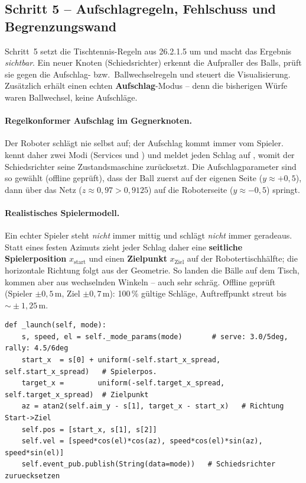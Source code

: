 \subsection{Schritt 5 -- Aufschlagregeln, Fehlschuss und Begrenzungswand}
Schritt~5 setzt die Tischtennis-Regeln aus 26.2.1.5 um und macht das Ergebnis
\emph{sichtbar}. Ein neuer Knoten  (Schiedsrichter) erkennt
die Aufpraller des Balls, prüft sie gegen die Aufschlag- bzw.\ Ballwechselregeln
und steuert die Visualisierung. Zusätzlich erhält  einen
echten \textbf{Aufschlag}-Modus -- denn die bisherigen Würfe waren Ballwechsel,
keine Aufschläge.

\paragraph{Regelkonformer Aufschlag im Gegnerknoten.} Der Roboter schlägt nie
selbst auf; der Aufschlag kommt immer vom Spieler.  kennt
daher zwei Modi (Services  und ) und
meldet jeden Schlag auf , womit der Schiedsrichter seine
Zustandsmaschine zurücksetzt. Die Aufschlagparameter sind so gewählt (offline
geprüft), dass der Ball zuerst auf der eigenen Seite ($y\approx+0{,}5$), dann über
das Netz ($z\approx0{,}97>0{,}9125$) auf die Roboterseite ($y\approx-0{,}5$) springt.

\paragraph{Realistisches Spielermodell.} Ein echter Spieler steht \emph{nicht}
immer mittig und schlägt \emph{nicht} immer geradeaus. Statt eines festen Azimuts
zieht jeder Schlag daher eine \textbf{seitliche Spielerposition} $x_{\text{start}}$
und einen \textbf{Zielpunkt} $x_{\text{Ziel}}$ auf der Robotertischhälfte; die
horizontale Richtung folgt aus der Geometrie. So landen die Bälle auf dem Tisch,
kommen aber aus wechselnden Winkeln -- auch sehr schräg. Offline geprüft (Spieler
$\pm0{,}5\,$m, Ziel $\pm0{,}7\,$m): 100\,\% gültige Schläge, Auftreffpunkt streut
bis $\sim\!\pm1{,}25\,$m.
\begin{lstlisting}[style=py,caption={\code{opponent\_serve} -- Spielermodell (Position + Ziel) und Schiedsrichter}]
def _launch(self, mode):
    s, speed, el = self._mode_params(mode)       # serve: 3.0/5deg, rally: 4.5/6deg
    start_x  = s[0] + uniform(-self.start_x_spread,  self.start_x_spread)   # Spielerpos.
    target_x =        uniform(-self.target_x_spread, self.target_x_spread)  # Zielpunkt
    az = atan2(self.aim_y - s[1], target_x - start_x)   # Richtung Start->Ziel
    self.pos = [start_x, s[1], s[2]]
    self.vel = [speed*cos(el)*cos(az), speed*cos(el)*sin(az), speed*sin(el)]
    self.event_pub.publish(String(data=mode))   # Schiedsrichter zuruecksetzen
\end{lstlisting}

